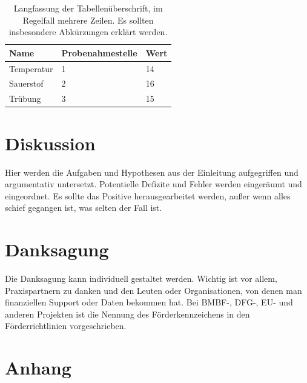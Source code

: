 \documentclass[english,ngerman,BCOR=6mm,cdgeometry=no,DIV=13]{tudscrreprt}
\begin{document}
\begin{table}
	\centering
	\caption[Kurzfassung der Tabellenüberschrft]{Langfassung der Tabellenüberschrift,
	        im Regelfall mehrere Zeilen. Es sollten insbesondere Abkürzungen erklärt werden.}
	\label{tab:my_label}
	\begin{tabular}{lll}\hline
		Name & Probenahmestelle & Wert\\\hline
		Temperatur & 1  & 14  \\
		Sauerstof & 2  & 16 \\
		Trübung & 3 & 15 \\ \hline
	\end{tabular}
\end{table}

\chapter{Diskussion}

Hier werden die Aufgaben und Hypothesen aus der Einleitung aufgegriffen und
argumentativ untersetzt. Potentielle Defizite und Fehler werden eingeräumt und
eingeordnet. Es sollte das Positive herausgearbeitet werden, außer wenn alles
schief gegangen ist, was selten der Fall ist.

\chapter*{Danksagung} %


Die Danksagung kann individuell gestaltet werden. Wichtig ist vor allem,
Praxispartnern zu danken und den Leuten oder Organisationen, von denen man
finanziellen Support oder Daten bekommen hat. Bei BMBF-, DFG-, EU- und anderen
Projekten ist die Nennung des Förderkennzeichens in den Förderrichtlinien
vorgeschrieben.


\printbibliography



\setcounter{chapter}{0}
\renewcommand\thechapter{\Alph{chapter}}
\chapter{Anhang}
\end{document}

